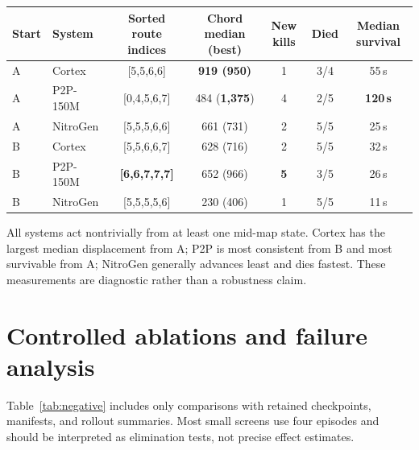 \documentclass[11pt]{article}
\begin{document}
\begin{center}
\begin{minipage}{\textwidth}
\centering
\small
\setlength{\tabcolsep}{4pt}
\begin{tabular}{llccccc}
\toprule
Start & System & Sorted route indices & Chord median (best) & New kills & Died & Median survival \\
\midrule
A & Cortex & [5,5,6,6] & \textbf{919 (950)} & 1 & 3/4 & 55\,s \\
A & P2P-150M & [0,4,5,6,7] & 484 (\textbf{1{,}375}) & 4 & 2/5 & \textbf{120\,s} \\
A & NitroGen & [5,5,5,6,6] & 661 (731) & 2 & 5/5 & 25\,s \\
\midrule
B & Cortex & [5,5,6,6,7] & 628 (716) & 2 & 5/5 & 32\,s \\
B & P2P-150M & \textbf{[6,6,7,7,7]} & 652 (966) & \textbf{5} & 3/5 & 26\,s \\
B & NitroGen & [5,5,5,5,6] & 230 (406) & 1 & 5/5 & 11\,s \\
\bottomrule
\end{tabular}
\label{tab:spawns}
\end{minipage}
\end{center}

All systems act nontrivially from at least one mid-map state. Cortex has the largest median displacement from A; P2P is most consistent from B and most survivable from A; NitroGen generally advances least and dies fastest. These measurements are diagnostic rather than a robustness claim.

\section{Controlled ablations and failure analysis}\label{sec:negative}

Table~\ref{tab:negative} includes only comparisons with retained checkpoints, manifests, and rollout summaries. Most small screens use four episodes and should be interpreted as elimination tests, not precise effect estimates.
\end{document}
